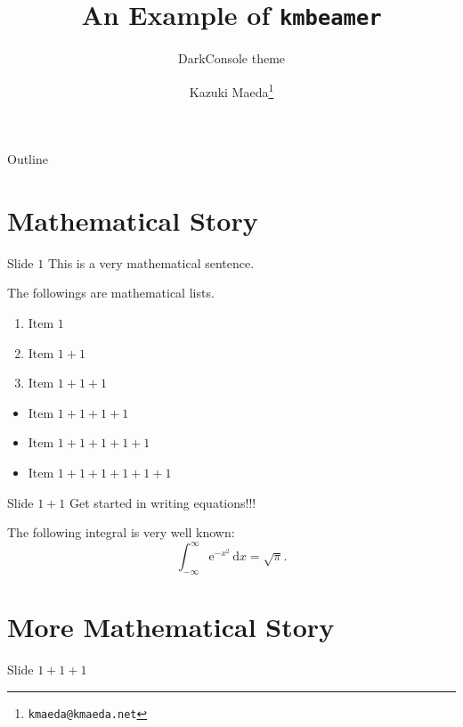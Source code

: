 \documentclass{beamer}
\title{An Example of \texttt{kmbeamer}}
\subtitle{DarkConsole theme}
\author{Kazuki Maeda\footnote{\texttt{kmaeda@kmaeda.net}}}
\begin{document}
\begin{frame}
  \maketitle
\end{frame}

\begin{frame}{Outline}
  \tableofcontents
\end{frame}

\section{Mathematical Story}

\begin{frame}{Slide $1$}
  This is a very mathematical sentence.

  \pause

  The followings are mathematical lists.

  \begin{enumerate}
  \item Item $1$\pause
  \item Item $1+1$\pause
  \item Item $1+1+1$
  \end{enumerate}

  \pause

  \begin{itemize}
  \item Item $1+1+1+1$\pause
  \item Item $1+1+1+1+1$\pause
  \item Item $1+1+1+1+1+1$
  \end{itemize}
\end{frame}

\begin{frame}{Slide $1+1$}
  \alert{Get started in writing equations!!!}

  \begin{theorem}
    The following integral is very well known:
    \begin{equation}
      \int_{-\infty}^\infty \mathrm{e}^{-x^2}\,\mathrm{d}x=\sqrt{\pi}.
    \end{equation}

  \end{theorem}
\end{frame}

\section{More Mathematical Story}
\begin{frame}{Slide $1+1+1$}
  \lipsum[1]
\end{frame}
\end{document}
